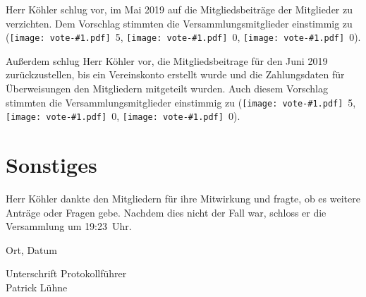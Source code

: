 \documentclass[a4paper, 10pt, headings=normal]{scrartcl}
\newenvironment{textinput}[1]%
{%
	\par%
	\vspace{0.75mm}%
	\noindent%
	\linespread{1}%
	\begin{tcolorbox}[colback=light-gray, sharp corners=all, boxrule=0pt, colframe=light-gray, left=1mm, top=0.3mm, bottom=-0.3mm, right=1mm, width=#1]
		\begin{minipage}[t]{\linewidth}%
			\textinputfont\strut%
}%
{%
			\strut%
		\end{minipage}%
	\end{tcolorbox}
	\vspace{0.75mm}%
}
\newcommand{\votesign}[1]{\texttt{[image: vote-\#1.pdf]}}
\newcommand{\votesingle}[2]{\votesign{#1}~#2}
\newcommand{\vote}[3]{\votesingle{yes}{#1}, \votesingle{no}{#2}, \votesingle{abstention}{#3}}
\begin{document}
Herr Köhler schlug vor, im Mai 2019 auf die Mitgliedsbeiträge der Mitglieder zu verzichten.
Dem Vorschlag stimmten die Versammlungsmitglieder einstimmig zu ({\vote{5}{0}{0}}).

Außerdem schlug Herr Köhler vor, die Mitgliedsbeitrage für den Juni 2019 zurückzustellen, bis ein Vereinskonto erstellt wurde und die Zahlungsdaten für Überweisungen den Mitgliedern mitgeteilt wurden.
Auch diesem Vorschlag stimmten die Versammlungsmitglieder einstimmig zu ({\vote{5}{0}{0}}).

\section{Sonstiges}

Herr Köhler dankte den Mitgliedern für ihre Mitwirkung und fragte, ob es weitere Anträge oder Fragen gebe.
Nachdem dies nicht der Fall war, schloss er die Versammlung um {19:23}~Uhr.

\bigskip

\begin{textinput}{0.5\linewidth - 2.5mm}%
	Ort, Datum%
\end{textinput}%

\noindent%
\begin{minipage}[c]{0.5\linewidth - 2.5mm}%
	\begin{textinput}{\linewidth}%
		Unterschrift Protokollführer\\%
		Patrick Lühne%
		\vspace{16mm}%
	\end{textinput}%
\end{minipage}%
\end{document}
